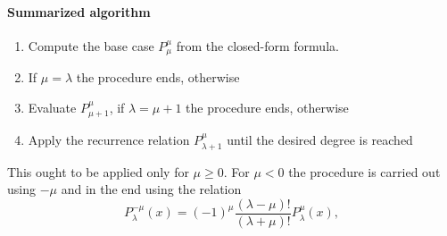 \paragraph{Summarized algorithm}
\begin{enumerate}
    \item Compute the base case $P_\mu^\mu$ from the closed-form formula.
    \item If $\mu = \lambda$ the procedure ends, otherwise
    \item Evaluate $P_{\mu+1}^\mu$, if $\lambda = \mu +1$ the procedure ends, otherwise
    \item Apply the recurrence relation $P_{\lambda+1}^\mu$ until the desired degree is reached
\end{enumerate}
This ought to be applied only for $ \mu \ge 0$. For $\mu < 0$ the procedure is carried out using $-\mu$ and in the end using the relation
\begin{equation}
    P_\lambda^{-\mu}(x) =  (-1)^{\mu}\frac{(\lambda-\mu)!}{(\lambda+\mu)!} P_\lambda^\mu(x),
\end{equation}

